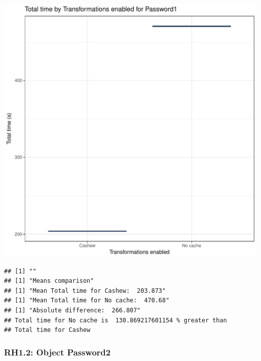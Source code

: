 \documentclass{article}\usepackage[]{graphicx}\usepackage[]{color}
\makeatletter
\def\maxwidth{ %
  \ifdim\Gin@nat@width>\linewidth
    \linewidth
  \else
    \Gin@nat@width
  \fi
}
\newenvironment{kframe}{%
 \def\at@end@of@kframe{}%
 \ifinner\ifhmode%
  \def\at@end@of@kframe{\end{minipage}}%
  \begin{minipage}{\columnwidth}%
 \fi\fi%
 \def\FrameCommand##1{\hskip\@totalleftmargin \hskip-\fboxsep
 \colorbox{shadecolor}{##1}\hskip-\fboxsep
     \hskip-\linewidth \hskip-\@totalleftmargin \hskip\columnwidth}%
 \MakeFramed {\advance\hsize-\width
   \@totalleftmargin\z@ \linewidth\hsize
   \@setminipage}}%
 {\par\unskip\endMakeFramed%
 \at@end@of@kframe}
\newenvironment{knitrout}{}{} %
\makeatother
\begin{document}
\begin{knitrout}
\color{fgcolor}
\includegraphics[width=\maxwidth]{figure/RH1_password-1} 
\begin{kframe}

{\ttfamily\noindent\bfseries\color{errorcolor}{\#\# Error in eval(expr, envir, enclos): object 'shap\_cashew\_password' not found}}\begin{verbatim}
## [1] ""
## [1] "Means comparison"
## [1] "Mean Total time for Cashew:  203.873"
## [1] "Mean Total time for No cache:  470.68"
## [1] "Absolute difference:  266.807"
## Total time for No cache is  130.869217601154 % greater than 
## Total time for Cashew
\end{verbatim}
\end{kframe}
\end{knitrout}


\subsubsection{RH1.2: Object Password2}
\end{document}
